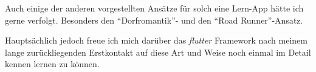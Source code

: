 Auch einige der anderen vorgestellten Ansätze für solch eine Lern-App hätte ich gerne verfolgt.
Besonders den \enquote{Dorfromantik}- und den \enquote{Road Runner}-Ansatz.

Hauptsächlich jedoch freue ich mich darüber das \emph{flutter} Framework nach meinem lange zurückliegenden Erstkontakt auf diese Art und Weise noch einmal im Detail kennen lernen zu können.
